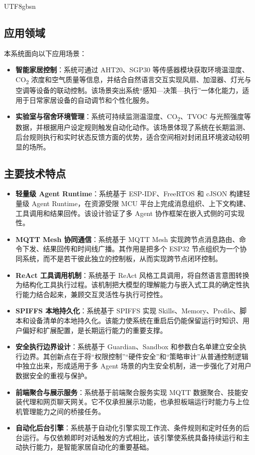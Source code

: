 \documentclass[a4paper,12pt]{article}
\begin{document}
\begin{CJK*}{UTF8}{gbsn}
\subsection{应用领域}
本系统面向以下应用场景：
\begin{itemize}
  \item \textbf{智能家居控制}：系统可通过 AHT20、SGP30 等传感器模块获取环境温湿度、CO\textsubscript{2} 浓度和空气质量等信息，并结合自然语言交互实现风扇、加湿器、灯光与空调等设备的联动控制。该场景突出系统“感知---决策---执行”一体化能力，适用于日常家居设备的自动调节和个性化服务。
  \item \textbf{实验室与宿舍环境管理}：系统可持续监测温湿度、CO\textsubscript{2}、TVOC 与光照强度等数据，并根据用户设定规则触发自动化动作。该场景体现了系统在长期监测、后台规则执行和实时状态反馈方面的优势，适合空间相对封闭且环境波动较明显的场所。
\end{itemize}

\subsection{主要技术特点}
\begin{itemize}
  \item \textbf{轻量级 Agent Runtime}：系统基于 ESP-IDF、FreeRTOS 和 cJSON 构建轻量级 Agent Runtime，在资源受限 MCU 平台上完成消息组织、上下文构建、工具调用和结果回传。该设计验证了多 Agent 协作框架在嵌入式侧的可实现性。
  \item \textbf{MQTT Mesh 协同通信}：系统基于 MQTT Mesh 实现跨节点消息路由、命令下发、结果回传和时间线广播。其作用是把多个 ESP32 节点组织为一个协同系统，而不是若干彼此独立的控制板，从而实现跨节点闭环控制。
  \item \textbf{ReAct 工具调用机制}：系统基于 ReAct 风格工具调用，将自然语言意图转换为结构化工具执行过程。该机制把大模型的理解能力与嵌入式工具的确定性执行能力结合起来，兼顾交互灵活性与执行可控性。
  \item \textbf{SPIFFS 本地持久化}：系统基于 SPIFFS 实现 Skills、Memory、Profile、脚本和设备清单的本地持久化。该能力使系统在重启后仍能保留运行时知识、用户偏好和扩展配置，是长期运行能力的重要支撑。
  \item \textbf{安全执行边界设计}：系统基于 Guardian、Sandbox 和参数白名单建立安全执行边界。其创新点在于将“权限控制”“硬件安全”和“策略审计”从普通控制逻辑中独立出来，形成适用于多 Agent 场景的内生安全机制，进一步强化了对用户数据安全的重视与保护。
  \item \textbf{前端聚合与展示服务}：系统基于前端聚合服务实现 MQTT 数据聚合、技能安装代理和网页聊天网关。它不仅承担展示功能，也承担板端运行时能力与上位机管理能力之间的桥接任务。
  \item \textbf{自动化后台引擎}：系统基于自动化引擎实现工作流、条件规则和定时任务的后台运行。与仅依赖即时对话触发的方式相比，该引擎使系统具备持续运行和主动执行能力，是智能家居自动化的重要基础。
\end{itemize}


\end{CJK*}
\end{document}
